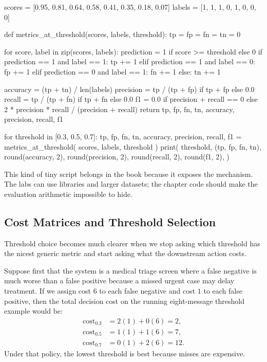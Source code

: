 \begin{codeexample}[caption={A pure-Python threshold sweep}]
scores = [0.95, 0.81, 0.64, 0.58, 0.41, 0.35, 0.18, 0.07]
labels = [1,    1,    1,    0,    1,    0,    0,    0]

def metrics_at_threshold(scores, labels, threshold):
    tp = fp = fn = tn = 0

    for score, label in zip(scores, labels):
        prediction = 1 if score >= threshold else 0
        if prediction == 1 and label == 1:
            tp += 1
        elif prediction == 1 and label == 0:
            fp += 1
        elif prediction == 0 and label == 1:
            fn += 1
        else:
            tn += 1

    accuracy = (tp + tn) / len(labels)
    precision = tp / (tp + fp) if tp + fp else 0.0
    recall = tp / (tp + fn) if tp + fn else 0.0
    f1 = 0.0 if precision + recall == 0 else 2 * precision * recall / (precision + recall)
    return tp, fp, fn, tn, accuracy, precision, recall, f1

for threshold in [0.3, 0.5, 0.7]:
    tp, fp, fn, tn, accuracy, precision, recall, f1 = metrics_at_threshold(
        scores, labels, threshold
    )
    print(
        threshold,
        (tp, fp, fn, tn),
        round(accuracy, 2),
        round(precision, 2),
        round(recall, 2),
        round(f1, 2),
    )
\end{codeexample}

\begin{practicalnote}
This kind of tiny script belongs in the book because it exposes the mechanism. The labs can use libraries and larger datasets; the chapter code should make the evaluation arithmetic impossible to hide.
\end{practicalnote}

\subsection{Cost Matrices and Threshold Selection}

Threshold choice becomes much clearer when we stop asking which threshold has the nicest generic metric and start asking what the downstream action costs.

Suppose first that the system is a medical triage screen where a false negative is much worse than a false positive because a missed urgent case may delay treatment. If we assign cost $6$ to each false negative and cost $1$ to each false positive, then the total decision cost on the running eight-message threshold example would be:
\begin{align*}
\text{cost}_{0.3} &= 2(1)+0(6)=2, \\
\text{cost}_{0.5} &= 1(1)+1(6)=7, \\
\text{cost}_{0.7} &= 0(1)+2(6)=12.
\end{align*}
Under that policy, the lowest threshold is best because misses are expensive.

